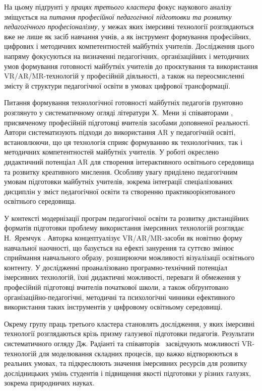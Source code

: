 
На цьому підґрунті у \emph{працях третього кластера} фокус наукового аналізу зміщується на \textit{питання професійної педагогічної підготовки та розвитку педагогічного професіоналізму,} у межах яких імерсивні технології розглядаються вже не лише як засіб навчання учнів, а як інструмент формування професійних, цифрових і методичних компетентностей майбутніх учителів. Дослідження цього напряму фокусуються на визначенні педагогічних, організаційних і методичних умов формування готовності майбутніх учителів до проєктування та використання VR/AR/MR-технологій у професійній діяльності, а також на переосмисленні змісту й структури педагогічної освіти в умовах цифрової трансформації.

Питання формування технологічної готовності майбутніх педагогів ґрунтовно розглянуто у систематичному огляді літератури Х.~Мени зі співавторами \cite{Shevchuk2024Readiness}, присвяченому професійній підготовці вчителів засобами доповненої реальності. Автори систематизують підходи до використання AR у педагогічній освіті, встановлюючи, що ця технологія сприяє формуванню як технологічних, так і методичних компетентностей майбутніх учителів. У роботі окреслено дидактичний потенціал AR для створення інтерактивного освітнього середовища та розвитку креативного мислення. Особливу увагу приділено педагогічним умовам підготовки майбутніх учителів, зокрема інтеграції спеціалізованих дисциплін у зміст педагогічної освіти та створенню практикоорієнтованого освітнього середовища.

У контексті модернізації програм педагогічної освіти та розвитку дистанційних форматів підготовки проблему використання імерсивних технологій розглядає Н.~Яремчук \cite{Omelchuk2024Secondary}. Авторка концептуалізує VR/AR/MR-засоби як новітню форму навчальної наочності, що базується на ефекті занурення та суттєво змінює сприймання навчального образу, розширюючи можливості візуалізації освітнього контенту. У дослідженні проаналізовано програмно-технічний потенціал імерсивних технологій, їхні дидактичні можливості, переваги й обмеження у професійній підготовці вчителів початкової школи, а також обґрунтовано організаційно-педагогічні, методичні та психологічні чинники ефективного використання таких інструментів у цифровому освітньому середовищі.

Окрему групу праць третього кластера становлять дослідження, у яких імерсивні технології розглядаються крізь призму галузевої підготовки педагогів. Результати систематичного огляду Дж. Радіанті та співавторів~\cite{Radianti2020VR} засвідчують можливості VR-технологій для моделювання складних процесів, що важко відтворюються в реальних умовах, та підкреслюють значення імерсивних ресурсів для розвитку дослідницьких умінь студентів і підвищення якості підготовки у різних галузях, зокрема природничих науках.

